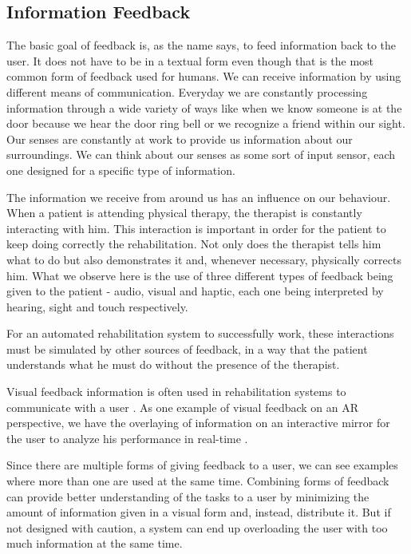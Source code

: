 \documentclass[runningheads]{llncs}
\begin{document}
\subsection{Information Feedback}
\label{RW-MF}

The basic goal of feedback is, as the name says, to feed information back to the user. 
It does not have to be in a textual form even though that is the most 
common form of feedback used for humans. We can receive information 
by using different means of communication. 
Everyday we are constantly processing information through a wide variety of ways like when 
we know someone is at the door because we hear the door ring bell or we recognize a friend within our sight.
Our senses are constantly at work to provide us information about our surroundings.
We can think about our senses as some sort of input sensor, each one designed for a specific type of information.

The information we receive from around us has an influence on our behaviour.
When a patient is attending physical therapy, the therapist is constantly interacting with him. 
This interaction is important in order for the patient to keep doing correctly the rehabilitation.
Not only does the therapist tells him what to do but also demonstrates it and, whenever necessary, physically corrects him.
What we observe here is the use of three different types of feedback being given to the patient - audio, visual and haptic,
each one being interpreted by hearing, sight and touch respectively.

For an automated rehabilitation system to successfully work, these interactions must 
be simulated by other sources of feedback, in a way that the patient understands 
what he must do without the presence of the therapist.

Visual feedback information is often used in rehabilitation systems to communicate with a user \cite{Design2005}. 
As one example of visual feedback on an \ac{AR} perspective, we have the overlaying of 
information on an interactive mirror for the user to analyze his performance in real-time \cite{Anderson,Tang2014a, Velloso2013, Klein2013,Alhamid2012a, blum2012}. 

Since there are multiple forms of giving feedback to a user, we can see examples where more than one are used at the same time.
Combining forms of feedback can provide better understanding of the tasks to a user by minimizing the amount of 
information given in a visual form and, instead, distribute it. 
But if not designed with caution, a system can end up overloading the user with too much information at the same time. 
\end{document}
